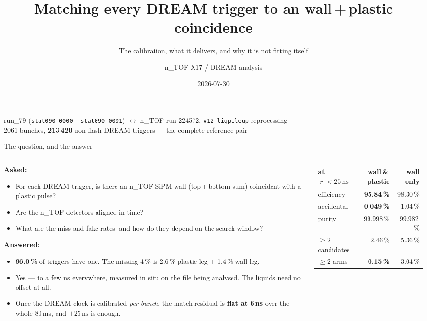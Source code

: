 \documentclass[aspectratio=169,10pt]{beamer}
\title[DREAM$\leftrightarrow$n\_TOF matching]%
      {Matching every DREAM trigger to an \ntof{} wall\,+\,plastic coincidence}
\subtitle{The calibration, what it delivers, and why it is not fitting itself}
\author{n\_TOF X17 / DREAM analysis}
\date{2026-07-30}
\newcommand{\ns}{\,\mathrm{ns}}
\newcommand{\hl}[1]{\textcolor{orange!75!black}{\textbf{#1}}}
\newcommand{\gd}[1]{\textcolor{green!35!black}{\textbf{#1}}}
\newcommand{\ntof}{n\_TOF}
\begin{document}
\begin{frame}[plain]
  \titlepage
  \begin{center}\small
  run\_79 (\texttt{stat090\_0000}\,+\,\texttt{stat090\_0001}) $\leftrightarrow$
  \ntof{} run 224572, \texttt{v12\_liqpileup} reprocessing\\
  2061 bunches, \textbf{213\,420} non-flash DREAM triggers --- the complete
  reference pair
  \end{center}
\end{frame}

\begin{frame}{The question, and the answer}
\begin{columns}[T]
\begin{column}{0.55\textwidth}
\textbf{Asked:}
\begin{itemize}\setlength\itemsep{0.3em}
  \item For each DREAM trigger, is there an \ntof{} SiPM-wall
        (top\,+\,bottom sum) coincident with a plastic pulse?
  \item Are the \ntof{} detectors aligned in time?
  \item What are the miss and fake rates, and how do they depend on the
        search window?
\end{itemize}
\vspace{0.5em}
\textbf{Answered:}
\begin{itemize}\setlength\itemsep{0.2em}
  \item \gd{96.0\,\%} of triggers have one. The missing 4\,\% is
        2.6\,\% plastic leg $+$ 1.4\,\% wall leg.
  \item Yes --- to a few ns everywhere, measured in situ on the file being
        analysed. The liquids need no offset at all.
  \item Once the DREAM clock is calibrated \emph{per bunch}, the match residual
        is \gd{flat at 6\,ns} over the whole 80\,ms, and \hl{$\pm25\ns$} is
        enough.
\end{itemize}
\end{column}
\begin{column}{0.43\textwidth}
\small
\begin{tabular}{lrr}
\toprule
at $|r|<25\ns$ & wall\,\&\,plastic & wall only\\
\midrule
efficiency        & \gd{95.84\,\%} & 98.30\,\%\\
accidental        & \gd{0.049\,\%} & 1.04\,\%\\
purity            & 99.998\,\%     & 99.982\,\%\\
$\geq2$ candidates& 2.46\,\%       & 5.36\,\%\\
$\geq2$ arms      & \gd{0.15\,\%}  & 3.04\,\%\\
\bottomrule
\end{tabular}
\vspace{0.6em}


\end{column}
\end{columns}
\end{frame}
\end{document}
